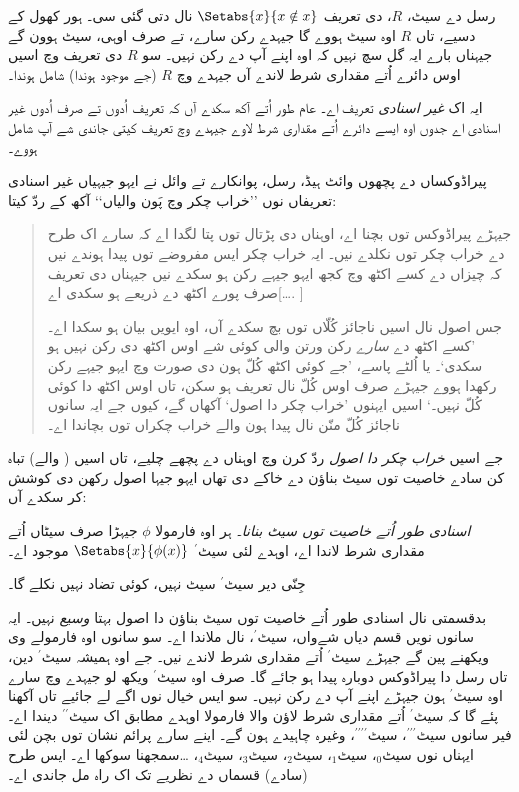 \documentclass[../../../include/open-logic-section]{subfiles}
\begin{document}


رسل دے سیٹ، $R$، دی تعریف $\Setabs{x}{x \notin x}$ نال دتی گئی سی۔
ہور کھول کے دسیے، تاں $R$ اوہ سیٹ ہووے گا جیہدے رکن سارے، تے صرف اوہی،
سیٹ ہوون گے جیہناں بارے ایہ گل سچ نہیں کہ اوہ اپنے آپ دے رکن نہیں۔
سو $R$ دی تعریف وچ اسیں اوس دائرے اُتے مقداری شرط لاندے آں جیہدے وچ
$R$ (جے موجود ہوندا) شامل ہوندا۔

ایہ اک \emph{غیر اسنادی} تعریف اے۔ عام طور اُتے آکھ سکدے آں کہ تعریف
اُدوں تے صرف اُدوں غیر اسنادی اے جدوں اوہ ایسے دائرے اُتے مقداری شرط
لاوے جیہدے وچ تعریف کیتی جاندی شے آپ شامل ہووے۔

پیراڈوکساں دے پچھوں وائٹ ہیڈ، رسل، پوانکارے تے وائل نے ایہو جیہیاں
غیر اسنادی تعریفاں نوں ’’خراب چکر وچ پَون والیاں‘‘ آکھ کے ردّ کیتا:
\begin{quote}
	جیہڑے پیراڈوکس توں بچنا اے، اوہناں دی پڑتال توں پتا لگدا اے کہ سارے
	اک طرح دے خراب چکر توں نکلدے نیں۔ ایہ خراب چکر ایس مفروضے توں پیدا
	ہوندے نیں کہ چیزاں دے کسے اکٹھ وچ کجھ ایہو جیہے رکن ہو سکدے نیں
	جیہناں دی تعریف صرف پورے اکٹھ دے ذریعے ہو سکدی اے[\ldots. \textparagraph]

	جس اصول نال اسیں ناجائز کُلّاں توں بچ سکدے آں، اوہ ایویں بیان ہو
	سکدا اے۔ ’کسے اکٹھ دے \emph{سارے} رکن ورتن والی کوئی شے اوس اکٹھ دی
	رکن نہیں ہو سکدی‘۔ یا اُلٹے پاسے، ’جے کوئی اکٹھ کُلّ ہون دی صورت وچ
	ایہو جیہے رکن رکھدا ہووے جیہڑے صرف اوس کُلّ نال تعریف ہو سکن، تاں
	اوس اکٹھ دا کوئی کُلّ نہیں۔‘ اسیں ایہنوں ’خراب چکر دا اصول‘ آکھاں گے،
	کیوں جے ایہ سانوں ناجائز کُلّ منّن نال پیدا ہون والے خراب چکراں توں
	بچاندا اے۔
	\citep[p.~37]{WhiteheadRussell1910}
\end{quote}
جے اسیں \emph{خراب چکر دا اصول} ردّ کرن وچ اوہناں دے پچھے چلیے، تاں اسیں
( والے) تباہ کن سادے خاصیت توں سیٹ بناؤن دے
خاکے دی تھاں ایہو جیہا اصول رکھن دی کوشش کر سکدے آں:

\begin{defish}
\emph{اسنادی طور اُتے خاصیت توں سیٹ بنانا۔} ہر اوہ فارمولا $\phi$ جیہڑا صرف سیٹاں اُتے مقداری شرط لاندا اے، اوہدے لئی سیٹ$^\prime$ $\Setabs{x}{\phi(x)}$ موجود اے۔
\end{defish}

جِنّی دیر سیٹ$^{\prime}$ سیٹ نہیں، کوئی تضاد نہیں نکلے گا۔

بدقسمتی نال اسنادی طور اُتے خاصیت توں سیٹ بناؤن دا اصول بہتا \emph{وسیع}
نہیں۔ ایہ سانوں نویں قسم دیاں شےواں، سیٹ$^\prime$، نال ملاندا اے۔
سو سانوں اوہ فارمولے وی ویکھنے پین گے جیہڑے سیٹ$^\prime$ اُتے مقداری شرط
لاندے نیں۔ جے اوہ ہمیشہ سیٹ$^\prime$ دین، تاں رسل دا پیراڈوکس دوبارہ
پیدا ہو جائے گا۔ صرف اوہ سیٹ$^\prime$ ویکھ لو جیہدے وچ سارے اوہ سیٹ$^\prime$ ہون
جیہڑے اپنے آپ دے رکن نہیں۔ سو ایس خیال نوں اگے لے جائیے تاں آکھنا پئے گا
کہ سیٹ$^\prime$ اُتے مقداری شرط لاؤن والا فارمولا اوہدے مطابق اک سیٹ$^{\prime\prime}$
دیندا اے۔ فیر سانوں سیٹ$^{\prime\prime\prime}$، سیٹ$^{\prime\prime\prime\prime}$،
وغیرہ چاہیدے ہون گے۔ اینے سارے پرائم نشان توں بچن لئی ایہناں نوں سیٹ$_0$،
سیٹ$_1$، سیٹ$_2$، سیٹ$_3$، سیٹ$_4$، \ldots سمجھنا سوکھا اے۔
ایس طرح (سادے) قسماں دے نظریے تک اک راہ مل جاندی اے۔
\end{document}
